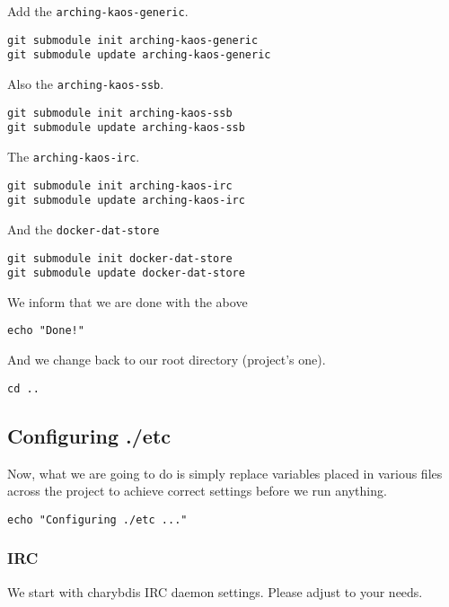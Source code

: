 \documentclass[12pt]{report}
\begin{document}
Add the \texttt{arching-kaos-generic}.

\begin{verbatim}
git submodule init arching-kaos-generic
git submodule update arching-kaos-generic
\end{verbatim}

Also the \texttt{arching-kaos-ssb}.

\begin{verbatim}
git submodule init arching-kaos-ssb
git submodule update arching-kaos-ssb
\end{verbatim}

The \texttt{arching-kaos-irc}.

\begin{verbatim}
git submodule init arching-kaos-irc
git submodule update arching-kaos-irc
\end{verbatim}

And the \texttt{docker-dat-store}

\begin{verbatim}
git submodule init docker-dat-store
git submodule update docker-dat-store
\end{verbatim}

We inform that we are done with the above

\begin{verbatim}
echo "Done!"
\end{verbatim}

And we change back to our root directory (project's one).

\begin{verbatim}
cd ..
\end{verbatim}


\subsection{Configuring ./etc}\label{configuring-.etc}

Now, what we are going to do is simply replace variables placed in
various files across the project to achieve correct settings before we
run anything.

\begin{verbatim}
echo "Configuring ./etc ..."
\end{verbatim}


\subsubsection{IRC}\label{irc}

We start with charybdis IRC daemon settings. Please adjust to your
needs.
\end{document}

